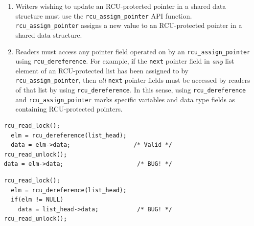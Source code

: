 \documentclass[preprint]{sigplanconf}
\begin{document}
\begin{enumerate}
	\item Writers wishing to update an RCU-protected pointer in a shared data structure must use the \texttt{rcu\_assign\_pointer} API function. \texttt{rcu\_assign\_pointer} assigns a new value to an RCU-protected pointer in a shared data structure.

	\item Readers must access any pointer field operated on by an \texttt{rcu\_\linebreak[0]assign\_pointer} using \texttt{rcu\_\linebreak[0]dereference}. For example, if the \texttt{next} pointer field in \emph{any} list element of an RCU-protected list has been assigned to by \texttt{rcu\_assign\_\linebreak[0]pointer}, then \emph{all} \texttt{next} pointer fields must be accessed by readers of that list by using \texttt{rcu\_\linebreak[0]dereference}. In this sense, using \texttt{rcu\_\linebreak[0]dereference} and \texttt{rcu\_assign\_\linebreak[0]pointer} marks specific variables and data type fields as containing RCU-protected pointers.

\end{enumerate}

%


\newsavebox\rcuexistencebug
\begin{lrbox}{\rcuexistencebug}
\begin{lstlisting}[basicstyle=\scriptsize\ttfamily]
rcu_read_lock();
  elm = rcu_dereference(list_head);
  data = elm->data;                  /* Valid */
rcu_read_unlock();
data = elm->data;                     /* BUG! */
\end{lstlisting}
\end{lrbox}

\newsavebox\rcuderefbug
\begin{lrbox}{\rcuderefbug}
\begin{lstlisting}[basicstyle=\scriptsize\ttfamily]
rcu_read_lock();
  elm = rcu_dereference(list_head);
  if(elm != NULL)
    data = list_head->data;           /* BUG! */
rcu_read_unlock();
\end{lstlisting}
\end{lrbox}
\end{document}
